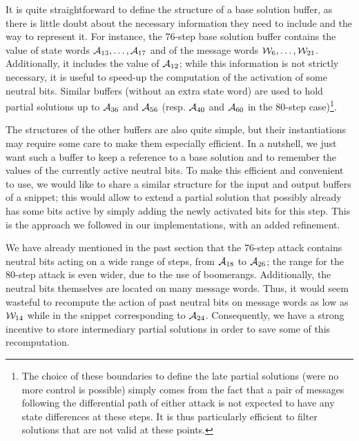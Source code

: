 It is quite straightforward to define the structure of a base solution buffer, as there is little doubt about the necessary information they need
to include and the way to represent it. For instance, the 76-step base solution buffer contains the value of state words $\mathcal{A}_{13},\ldots,\mathcal{A}_{17}$
and of the message words $\mathcal{W}_6,\ldots,\mathcal{W}_{21}$. Additionally, it includes the value of $\mathcal{A}_{12}$; while this information is
not strictly necessary, it is useful to speed-up the computation of the activation of some neutral bits. Similar buffers (without an extra state word)
are used to hold partial solutions up to $\mathcal{A}_{36}$ and $\mathcal{A}_{56}$ (resp. $\mathcal{A}_{40}$ and $\mathcal{A}_{60}$ in the 80-step case)\footnote{The choice
of these boundaries to define the late partial solutions (were no more control is possible) simply comes from the fact that a pair of messages following
the differential path of either attack is not expected to have any state differences at these steps. It is thus particularly efficient to filter
solutions that are not valid at these points.}.

The structures of the other buffers are also quite simple, but their instantiations may require some care to make them especially efficient.
In a nutshell, we just want such a buffer to keep a reference to a base solution and to remember the values of the currently active neutral bits.
To make this efficient and convenient to use, we would like to share a similar structure for the input and output buffers of a snippet; this would
allow to extend a partial solution that possibly already has some bits active by simply adding the newly activated bits for this step. This is the
approach we followed in our implementations, with an added refinement.

\medskip

We have already mentioned in the past section that \eg the 76-step attack contains neutral bits acting on a wide range of steps, from $\mathcal{A}_{18}$
to $\mathcal{A}_{26}$; the range for the 80-step attack is even wider, due to the use of boomerangs. Additionally, the neutral bits themselves are located on many message
words. Thus, it would seem wasteful to recompute the action of past neutral bits on message words as low as $\mathcal{W}_{14}$ while in the snippet corresponding
\eg to $\mathcal{A}_{24}$. Consequently, we have a strong incentive to store intermediary partial solutions in order to save some of this recomputation.

